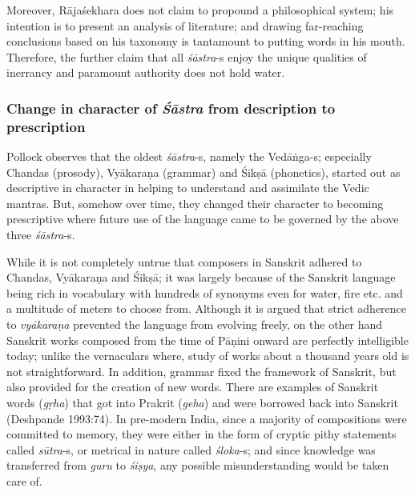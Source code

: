 Moreover, Rājaśekhara does not claim to propound a philosophical system; his intention is to present an analysis of literature; and drawing far-reaching conclusions based on his taxonomy is tantamount to putting words in his mouth. Therefore, the further claim that all {\sl śāstra}-s enjoy the unique qualities of inerrancy and paramount authority does not hold water.\\[-20pt]

\subsubsection{Change in character of {{\sl\bfseries Śāstra}\relax} from description to prescription}\label{art12-sec3.4.1}

\vskip -5pt

Pollock observes that the oldest {\sl śāstra}-s, namely the \hbox{Vedāṅga-s}; especially Chandas (prosody), Vyākaraṇa (grammar) and Śikṣā (phonetics), started out as descriptive in character in helping to understand and assimilate the Vedic mantras. But, somehow over time, they changed their character to becoming prescriptive where future use of the language came to be governed by the above three {\sl śāstra}-s.

While it is not completely untrue that composers in Sanskrit adhered to Chandas, Vyākaraṇa and Śikṣā; it was largely because of the Sanskrit language being rich in vocabulary with hundreds of synonyms even for water, ﬁre etc. and a multitude of meters to choose from. Although it is argued that strict adherence to {\sl vyākaraṇa} prevented the language from evolving freely, on the other hand Sanskrit works composed from the time of Pāṇini onward are perfectly intelligible today; unlike the vernaculars where, study of works about a thousand years old is not straightforward. In addition, grammar ﬁxed the framework of Sanskrit, but also provided for the creation of new words. There are examples of Sanskrit words ({\sl gṛha}) that got into Prakrit ({\sl geha}) and were borrowed back into Sanskrit (Deshpande 1993:74). In pre-modern India, since a majority of compositions were committed to memory, they were either in the form of cryptic pithy statements called {\sl sūtra}-s, or metrical in nature called {\sl śloka}-s; and since knowledge was transferred from {\sl guru} to {\sl śiṣya}, any possible misunderstanding would be taken care of.\\[-17pt]


